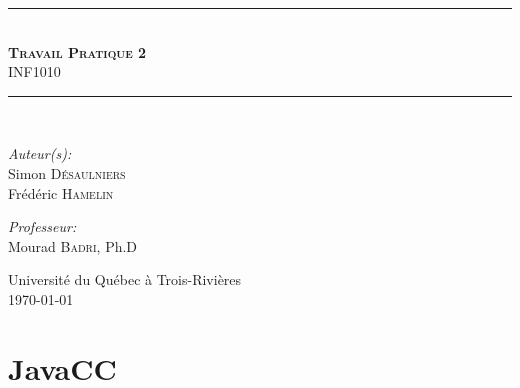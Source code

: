 \documentclass[11pt,french]{article}
\begin{document}
    \begin{titlepage}
        \begin{center}
            \noindent\rule{13cm}{1pt}\\[0.4cm]
            \textsc{\huge \bfseries Travail Pratique 2}\\
                                    INF1010\\[0.4cm]
            \noindent\rule{13cm}{1pt}\\[5cm]

            \begin{minipage}{0.4\textwidth}
                \begin{flushleft}
                \large\emph{Auteur(s):}\\[0.5cm]
                    Simon \textsc{Désaulniers}\\
                    Frédéric \textsc{Hamelin}
                \end{flushleft}
            \end{minipage}
            \begin{minipage}{0.5\textwidth}
                \begin{flushright} \large
                    \emph{Professeur:} \\[0.5cm]
                    Mourad \textsc{Badri}, Ph.D
                    \vspace{\parskip}
                \end{flushright}
            \end{minipage}

            \vfill
            {\large Université du Québec à Trois-Rivières\\ \today}
        \end{center}
        \thispagestyle{empty}
    \end{titlepage}

    \setcounter{page}{1}


    \section{JavaCC} %
    \label{sec:javacc}
\end{document}
